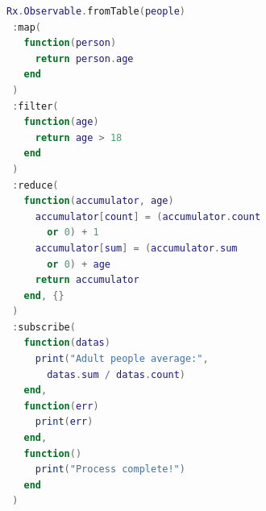 \begin{minipage}{\linewidth}
\begin{lstlisting}[language=LUA,caption={Process pipeline example, using the library RxLua},label=pipeline-example]
Rx.Observable.fromTable(people)
 :map(
   function(person)
     return person.age
   end
 )
 :filter(
   function(age)
     return age > 18
   end
 )
 :reduce(
   function(accumulator, age)
     accumulator[count] = (accumulator.count
       or 0) + 1
     accumulator[sum] = (accumulator.sum
       or 0) + age
     return accumulator
   end, {}
 )
 :subscribe(
   function(datas)
     print("Adult people average:",
       datas.sum / datas.count)
   end,
   function(err)
     print(err)
   end,
   function()
     print("Process complete!")
   end
 )
\end{lstlisting}
\end{minipage}
